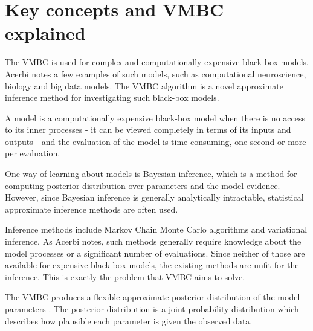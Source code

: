 \documentclass[english,oneside,openany]{UH_DS_report}
\begin{document}
\chapter{Key concepts and VMBC explained}
\label{chapter:structure}


The VMBC is used for complex and computationally expensive black-box models. 
Acerbi notes a few examples of such models, such as computational neuroscience, biology and 
big data models\cite{acerbi2018}\cite{acerbi2020}.
The VMBC algorithm is a novel approximate inference  method for investigating such black-box models. 

A model is a computationally expensive black-box model when there is no access to its inner processes - 
it can be viewed completely in terms of its inputs and outputs - and the evaluation of the model is time consuming, one second or 
more per evaluation\cite{pyvmbc}. 

One way of learning about models is Bayesian inference, 
which is a method for computing posterior distribution
over parameters and the model evidence. However, since Bayesian inference is generally analytically intractable,
statistical approximate inference methods are often used.\cite{acerbi2018}

Inference methods include Markov Chain Monte Carlo algorithms and variational inference. As Acerbi notes, such methods 
generally require knowledge about the model processes or a significant number of evaluations\cite{acerbi2018}. 
Since neither of those are available for expensive black-box models, the existing methods are unfit for the inference.
This is exactly the problem that VMBC aims to solve.

The VMBC produces a flexible approximate posterior distribution of the model parameters 
\cite{pyvmbc}. The posterior distribution is a joint probability distribution which describes 
how plausible each parameter is given the observed data.
\end{document}
